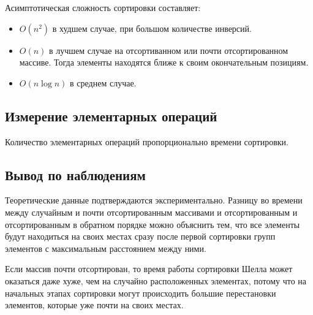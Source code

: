 \documentclass[11pt]{article}
\begin{document}
\begin{center}
\end{center}
{ \hspace*{\fill} }

Асимптотическая сложность сортировки составляет:
\begin{itemize}
    \item $O(n^2)$ в худшем случае, при большом количестве инверсий.
    \item $O(n)$ в лучшем случае на отсортиванном или почти отсортированном массиве. Тогда элементы находятся ближе к своим окончательным
    позициям.
    \item $O(n\log n)$ в среднем случае.
\end{itemize}

\subsection{Измерение элементарных операций}

\begin{center}
\end{center}
{ \hspace*{\fill} }

\begin{center}
\end{center}
{ \hspace*{\fill} }

Количество элементарных операций пропорционально времени сортировки.

\subsection{Вывод по наблюдениям}

Теоретические данные подтверждаются экспериментально. Разницу во времени между случайным и почти отсортированным
массивами и отсортированным и отсортированным в обратном порядке можно объяснить тем, что все элементы будут находиться на своих
местах сразу после первой сортировки групп элементов с максимальным расстоянием между ними.

Если массив почти отсортирован, то время работы сортировки Шелла может оказаться даже хуже, чем на случайно расположенных элементах, потому что на начальных
этапах сортировки могут происходить большие перестановки элементов, которые уже почти на своих местах.
\end{document}
